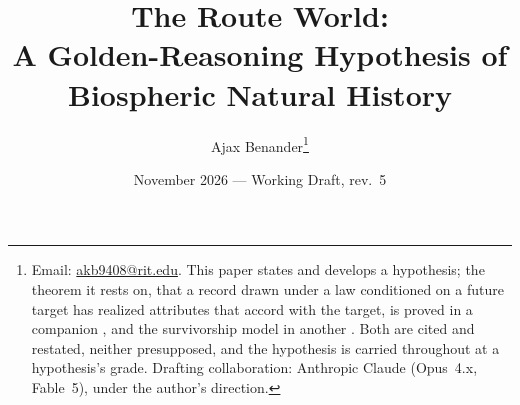 \newcommand{\eqd}{\overset{d}{=}}
\newcommand{\one}{\mathbf{1}}
\newcommand{\Imm}{\mathcal{I}}
\newcommand{\Fc}{\mathcal{F}}
\newcommand{\Lc}{\mathcal{L}}
\newcommand{\hm}{\mathfrak{h}}
\newcommand{\Ac}{\mathcal{A}}
\newcommand{\Sc}{\mathsf{S}}
\theoremstyle{plain}
\newtheorem{theorem}{Theorem}[section]
\newtheorem{proposition}[theorem]{Proposition}
\newtheorem{lemma}[theorem]{Lemma}
\newtheorem{corollary}[theorem]{Corollary}
\newtheorem{claim}[theorem]{Claim}
\theoremstyle{definition}
\newtheorem{definition}[theorem]{Definition}
\newtheorem{ansatz}[theorem]{Ansatz}
\newtheorem{convention}[theorem]{Convention}
\newtheorem{constraint}{Constraint}
\newtheorem{principle}{Principle}
\newtheorem{axiom}{Axiom}
\newtheorem{example}[theorem]{Example}
\newtheorem{premise}{Premise}
\newtheorem{objection}[theorem]{Objection}
\renewcommand{\thepremise}{$\Phi$\arabic{premise}}
\theoremstyle{remark}
\newtheorem{remark}[theorem]{Remark}
\title{The Route World:\\ \large A Golden-Reasoning Hypothesis of Biospheric Natural History}
\author{Ajax Benander\thanks{Email:
\href{mailto:akb9408@rit.edu}{akb9408@rit.edu}. This paper states and
develops a hypothesis; the theorem it rests on, that a record drawn under
a law conditioned on a future target has realized attributes that accord
with the target, is proved in a companion \cite{GoldenTargeted}, and the
survivorship model in another \cite{GoldenSurvivorship}. Both are cited and restated,
neither presupposed, and the hypothesis is carried throughout at a
hypothesis's grade. Drafting collaboration: Anthropic Claude (Opus~4.x,
Fable~5), under the author's direction.}}
\date{November 2026 --- Working Draft, rev.~5}

\maketitle

